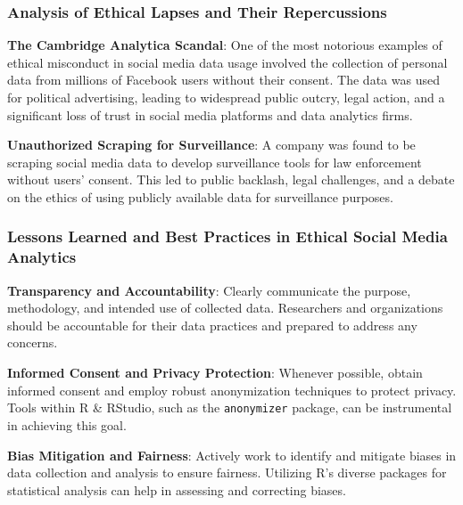 \documentclass[
]{book}
\begin{document}
\hypertarget{analysis-of-ethical-lapses-and-their-repercussions}{%
\subsubsection*{Analysis of Ethical Lapses and Their Repercussions}\label{analysis-of-ethical-lapses-and-their-repercussions}}

\textbf{The Cambridge Analytica Scandal}: One of the most notorious examples of ethical misconduct in social media data usage involved the collection of personal data from millions of Facebook users without their consent. The data was used for political advertising, leading to widespread public outcry, legal action, and a significant loss of trust in social media platforms and data analytics firms.

\textbf{Unauthorized Scraping for Surveillance}: A company was found to be scraping social media data to develop surveillance tools for law enforcement without users' consent. This led to public backlash, legal challenges, and a debate on the ethics of using publicly available data for surveillance purposes.

\hypertarget{lessons-learned-and-best-practices-in-ethical-social-media-analytics}{%
\subsubsection*{Lessons Learned and Best Practices in Ethical Social Media Analytics}\label{lessons-learned-and-best-practices-in-ethical-social-media-analytics}}

\textbf{Transparency and Accountability}: Clearly communicate the purpose, methodology, and intended use of collected data. Researchers and organizations should be accountable for their data practices and prepared to address any concerns.

\textbf{Informed Consent and Privacy Protection}: Whenever possible, obtain informed consent and employ robust anonymization techniques to protect privacy. Tools within R \& RStudio, such as the \texttt{anonymizer} package, can be instrumental in achieving this goal.

\textbf{Bias Mitigation and Fairness}: Actively work to identify and mitigate biases in data collection and analysis to ensure fairness. Utilizing R's diverse packages for statistical analysis can help in assessing and correcting biases.
\end{document}
